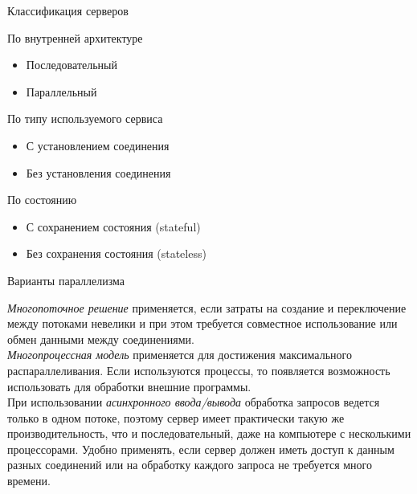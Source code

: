 \begin{frame}{Классификация серверов}
	\begin{block}{По внутренней архитектуре}
		\begin{itemize}
			\item Последовательный
			\item Параллельный
		\end{itemize}
	\end{block}
	\pause
	\begin{block}{По типу используемого сервиса}
		\begin{itemize}
			\item С установлением соединения
			\item Без установления соединения
		\end{itemize}
	\end{block}
	\pause
	\begin{block}{По состоянию}
		\begin{itemize}
			\item С сохранением состояния (stateful)
			\item Без сохранения состояния (stateless)
		\end{itemize}
	\end{block}
\end{frame}

\begin{frame}{Варианты параллелизма}

	{\itshape Многопоточное решение} применяется,  если затраты на создание и переключение между потоками невелики 
и при этом требуется совместное использование или обмен данными между соединениями.\\
\pause
{\itshape Многопроцессная модель} применяется для достижения максимального распараллеливания. Если используются процессы,  то появляется возможность использовать для обработки внешние программы.\\
\pause
При использовании {\itshape асинхронного ввода/вывода} обработка запросов ведется только в одном потоке,
поэтому сервер имеет практически такую же производительность,  что и последовательный,  даже на компьютере с несколькими процессорами. 
Удобно применять, если сервер должен иметь доступ к данным разных соединений или на обработку каждого запроса не требуется много времени.
\end{frame}



